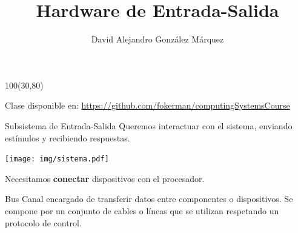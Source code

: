 \documentclass[aspectratio=169]{beamer}
\title{\Huge Hardware de Entrada-Salida}
\author{David Alejandro González Márquez}
\date{}
\begin{document}
\begin{frame}[plain]
    \titlepage
    \begin{textblock}{100}(30,80)
    \begin{tcolorbox}[size=small,width=\textwidth,colback={gray!30},title={}]
    \begin{center}
     \scriptsize Clase disponible en: \url{https://github.com/fokerman/computingSystemsCourse}
    \end{center}
    \end{tcolorbox}
    \end{textblock}
\end{frame}

\begin{frame}[fragile]{Subsistema de Entrada-Salida}
    Queremos interactuar con el sistema, enviando estímulos y recibiendo respuestas.
    \begin{center} \texttt{[image: img/sistema.pdf]} \end{center}
    \begin{center}
    \textcolor{verdeuca}{Necesitamos \textbf{conectar} dispositivos con el procesador.}
    \end{center}
    \pause
    \vspace{-0.3cm}
    \begin{block}{\Large Bus}
    Canal encargado de transferir datos entre componentes o dispositivos. 
    Se compone por un conjunto de cables o líneas que se utilizan respetando un protocolo de control.
    \end{block}
\end{frame}
\end{document}
